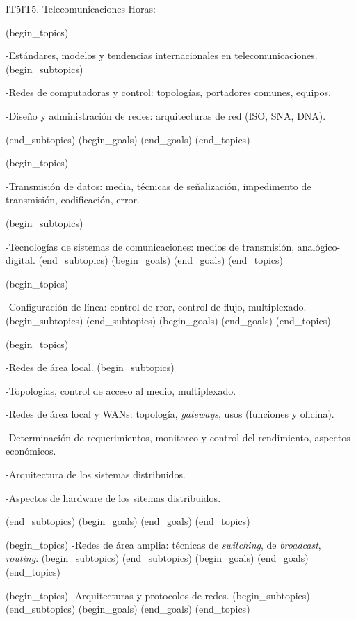 \begin{BKL2}{IT5}{IT5. Telecomunicaciones}
Horas:
 
(begin_topics)

-Estándares, modelos y tendencias internacionales en telecomunicaciones.
(begin_subtopics)

-Redes de computadoras y control: topologías, portadores comunes, equipos.

-Diseño y administración de redes: arquitecturas de red (ISO, SNA, DNA).

(end_subtopics)
(begin_goals)
(end_goals)
(end_topics)

 

(begin_topics)

-Transmisión de datos: media, técnicas de señalización, impedimento de transmisión, codificación, error.

(begin_subtopics)

-Tecnologías de sistemas de comunicaciones: medios de transmisión, analógico-digital.
(end_subtopics)
(begin_goals)
(end_goals)
(end_topics)

 

(begin_topics)

-Configuración de línea: control de rror, control de flujo, multiplexado.
(begin_subtopics)
(end_subtopics)
(begin_goals)
(end_goals)
(end_topics)

 

(begin_topics)

-Redes de área local.
(begin_subtopics)

-Topologías, control de acceso al medio, multiplexado.

-Redes de área local y WANs: topología, {\it gateways}, usos (funciones y oficina).

-Determinación de requerimientos, monitoreo y control del rendimiento, aspectos económicos.

-Arquitectura de los sistemas distribuidos.

-Aspectos de hardware de los sitemas distribuidos.

(end_subtopics)
(begin_goals)
(end_goals)
(end_topics)


(begin_topics)
-Redes de área amplia: técnicas de {\it switching}, de {\it broadcast}, {\it routing}.
(begin_subtopics)
(end_subtopics)
(begin_goals)
(end_goals)
(end_topics)

 

(begin_topics)
-Arquitecturas y protocolos de redes.
(begin_subtopics)
(end_subtopics)
(begin_goals)
(end_goals)
(end_topics)


\end{BKL2}
